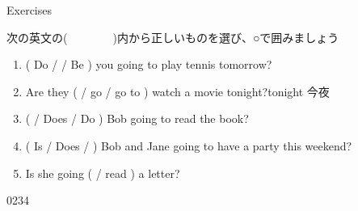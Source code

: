 \documentclass[aspectratio=169,xcolor={dvipsnames,table}]{beamer}
\newcommand{\myaudio}[1]{\href{#1}{\faVolumeUp}}
\begin{document}
\begin{frame}[plain]{Exercises}

{\small 次の英文の(~~~~~~~~)内から正しいものを選び、○で囲みましょう}

\begin{enumerate}
 \item ( Do /  / Be )  you going to play tennis tomorrow?
 \item Are they (  / go  / go to ) watch a movie tonight?\hfill{\scriptsize tonight  今夜}
 \item  (  / Does / Do ) Bob going to read the book?
 \item ( Is / Does /   ) Bob and Jane going to have a party this weekend?
 \item  Is she going (  / read ) a letter?
\end{enumerate}
\hfill{\tiny 0234}\,{\scriptsize \myaudio{./audio/011_be_going_to_07.mp3}}
 \end{frame}
\end{document}
